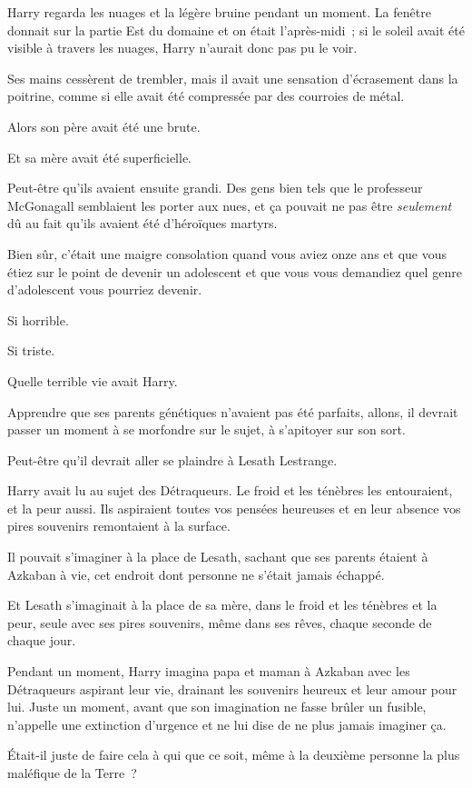 Harry regarda les nuages et la légère bruine pendant un moment. La fenêtre donnait sur la partie Est du domaine et on était l'après-midi~; si le soleil avait été visible à travers les nuages, Harry n'aurait donc pas pu le voir.

Ses mains cessèrent de trembler, mais il avait une sensation d'écrasement dans la poitrine, comme si elle avait été compressée par des courroies de métal.

Alors son père avait été une brute.

Et sa mère avait été superficielle.

Peut-être qu'ils avaient ensuite grandi. Des gens bien tels que le professeur McGonagall semblaient les porter aux nues, et ça pouvait ne pas être \emph{seulement} dû au fait qu'ils avaient été d'héroïques martyrs.

Bien sûr, c'était une maigre consolation quand vous aviez onze ans et que vous étiez sur le point de devenir un adolescent et que vous vous demandiez quel genre d'adolescent vous pourriez devenir.

Si horrible.

Si triste.

Quelle terrible vie avait Harry.

Apprendre que ses parents génétiques n'avaient pas été parfaits, allons, il devrait passer un moment à se morfondre sur le sujet, à s'apitoyer sur son sort.

Peut-être qu'il devrait aller se plaindre à Lesath Lestrange.

Harry avait lu au sujet des Détraqueurs. Le froid et les ténèbres les entouraient, et la peur aussi. Ils aspiraient toutes vos pensées heureuses et en leur absence vos pires souvenirs remontaient à la surface.

Il pouvait s'imaginer à la place de Lesath, sachant que ses parents étaient à Azkaban à vie, cet endroit dont personne ne s'était jamais échappé.

Et Lesath s'imaginait à la place de sa mère, dans le froid et les ténèbres et la peur, seule avec ses pires souvenirs, même dans ses rêves, chaque seconde de chaque jour.

Pendant un moment, Harry imagina papa et maman à Azkaban avec les Détraqueurs aspirant leur vie, drainant les souvenirs heureux et leur amour pour lui. Juste un moment, avant que son imagination ne fasse brûler un fusible, n'appelle une extinction d'urgence et ne lui dise de ne plus jamais imaginer ça.

Était-il juste de faire cela à qui que ce soit, même à la deuxième personne la plus maléfique de la Terre~?

